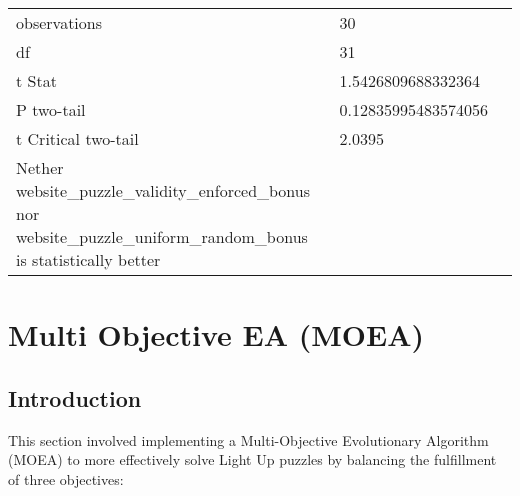 \documentclass[11pt]{article}
\begin{document}
\begin{table}[H]
{\begin{tabular}{|l|l|l|}
                                                                                                                        &                                         &                                            \\ \hline
    observations                                                                                                          & 30                                      &                                            \\ \hline
    df                                                                                                                    & 31                                      &                                            \\ \hline
    t Stat                                                                                                                & 1.5426809688332364                      &                                            \\ \hline
    P two-tail                                                                                                            & 0.12835995483574056                     &                                            \\ \hline
    t Critical two-tail                                                                                                   & 2.0395                                  &                                            \\ \hline
    Nether website\_puzzle\_validity\_enforced\_bonus nor website\_puzzle\_uniform\_random\_bonus is statistically better &                                         &                                            \\ \hline
    \end{tabular}%
    }
\end{table}


\section{Multi Objective EA (MOEA)}

\subsection{Introduction}

This section involved implementing a Multi-Objective Evolutionary Algorithm (MOEA)
to more effectively solve Light Up puzzles by balancing the fulfillment of three
objectives: 
\end{document}
